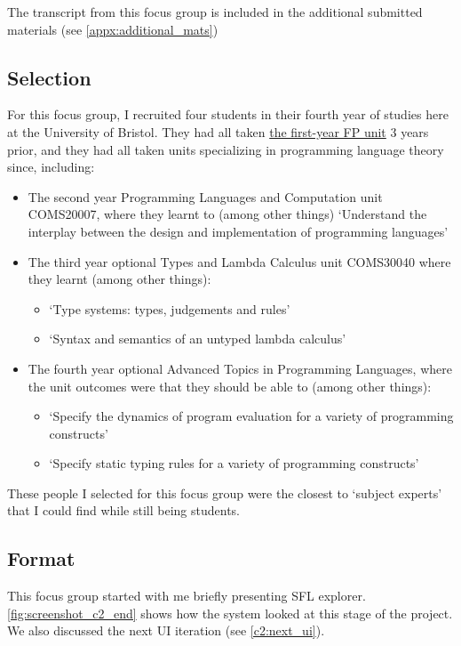 The transcript from this focus group is included in the additional submitted materials (see \ref{appx:additional_mats})

\subsection{Selection}

For this focus group, I recruited four students in their fourth year of studies here at the University of Bristol. They had all taken \hyperref[COMS10016]{the first-year FP unit} 3 years prior, and they had all taken units specializing in programming language theory since, including:

\begin{itemize}
    \item The second year Programming Languages and Computation unit COMS20007, where they learnt to (among other things) `Understand the interplay between the design and implementation of programming languages' \cite{COMS20007_PLC}
    \item The third year optional Types and Lambda Calculus unit COMS30040 where they learnt (among other things): \cite{COMS30040_TLC} 
    \begin{itemize}
        \item `Type systems: types, judgements and rules'
        \item `Syntax and semantics of an untyped lambda calculus'
    \end{itemize}
    \item The fourth year optional Advanced Topics in Programming Languages, where the unit outcomes were that they should be able to (among other things): \cite{COMSM0067_ATPL}
    \begin{itemize}
        \item `Specify the dynamics of program evaluation for a variety of programming constructs'
        \item `Specify static typing rules for a variety of programming constructs'
    \end{itemize}
\end{itemize}

These people I selected for this focus group were the closest to `subject experts' that I could find while still being students. 

\subsection{Format}
This focus group started with me briefly presenting SFL explorer. \ref{fig:screenshot_c2_end} shows how the system looked at this stage of the project. We also discussed the next UI iteration (see \ref{c2:next_ui}). 

